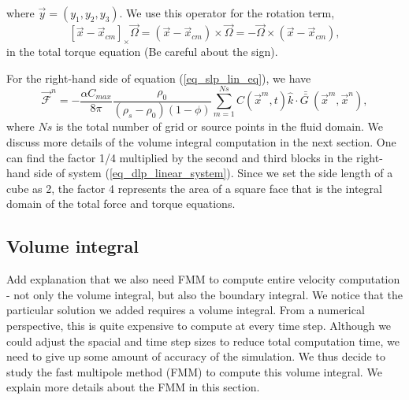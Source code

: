  where $\vec{y} = (y_1, y_2, y_3).$
We use this operator for the rotation term, 
 \[
  [\vec{x} - \vec{x}_{cm}]_{\times}  \vec{\Omega}
   = (\vec{x} - \vec{x}_{cm}) \times \vec{\Omega}
  = - \vec{\Omega} \times  (\vec{x} - \vec{x}_{cm}),
  \]
  in the total torque equation (Be careful about the sign).
  \par
   For the right-hand side of equation (\ref{eq_slp_lin_eq}), we have
   \[
   {\vec{\mathcal{F}}}^n = 
   -\frac{ \alpha C_{max}}{8\pi } \frac{\rho_0}{(\rho_s - \rho_0)(1-\phi)} 
  \sum_{m= 1}^{Ns}  C \left(\vec{x}^m,  t \right) \hat{k} \cdot
  \bar{\bar{G \ }}(\vec{x}^m, \vec{x}^n ),
   \]
   where $Ns$ is the total number of grid or source points in the fluid domain. We discuss more details of the volume integral computation in the next section. 
  One can find the factor 1/4 multiplied by the second and third blocks in the right-hand side of system (\ref{eq_dlp_linear_system}). 
 Since we set the side length of a cube as 2, the factor 4 represents the area of a square face that is the integral domain of the total force and torque equations.

 \subsection{Volume integral} \label{section_vel_numerics}
 {\color{blue} Add explanation that we also need FMM to compute entire velocity computation - not only the volume integral, but also the boundary integral.}
We notice that the particular solution we added requires a volume integral. From a numerical perspective, this is quite expensive to compute at every time step. Although we could adjust the spacial and time step sizes to reduce total computation time, we need to give up some amount of accuracy of the simulation. We thus decide to study the fast multipole method (FMM) to compute this volume integral. We explain more details about the FMM in this section. 
